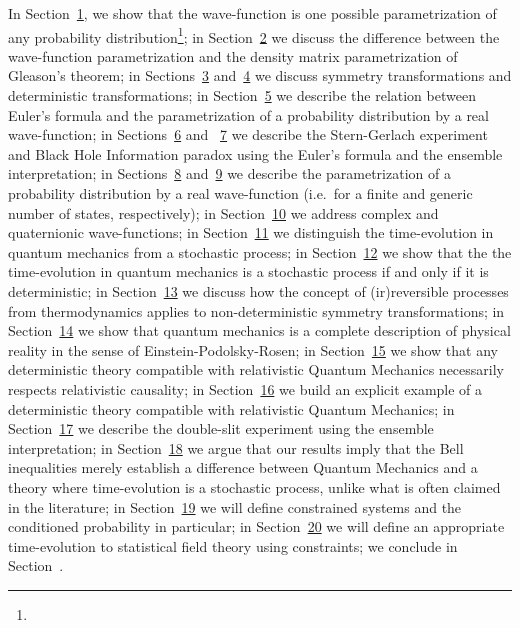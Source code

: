 \documentclass[11pt]{book}
\begin{document}
In Section~\protect\hyperlink{sec:prob}{1}, we show that the
wave-function is one possible parametrization of any probability
distribution\footnote{}; in Section~\protect\hyperlink{sec:density}{2}
we discuss the difference between the wave-function parametrization and
the density matrix parametrization of Gleason's theorem; in
Sections~\protect\hyperlink{sec:symmetries}{3}
and~\protect\hyperlink{sec:deterministic}{4} we discuss symmetry
transformations and deterministic transformations; in
Section~\protect\hyperlink{sec:euler}{5} we describe the relation
between Euler's formula and the parametrization of a probability
distribution by a real wave-function; in
Sections~\protect\hyperlink{sec:sg}{6} and
~\protect\hyperlink{sec:informationparadox}{7} we describe the
Stern-Gerlach experiment and Black Hole Information paradox using the
Euler's formula and the ensemble interpretation; in
Sections~\protect\hyperlink{sec:mapN}{8}
and~\protect\hyperlink{sec:map}{9} we describe the parametrization of a
probability distribution by a real wave-function (i.e.~for a finite and
generic number of states, respectively); in
Section~\protect\hyperlink{sec:complex}{10} we address complex and
quaternionic wave-functions; in
Section~\protect\hyperlink{sec:stochastic}{11} we distinguish the
time-evolution in quantum mechanics from a stochastic process; in
Section~\protect\hyperlink{sec:timetranslation}{12} we show that the the
time-evolution in quantum mechanics is a stochastic process if and only
if it is deterministic; in
Section~\protect\hyperlink{sec:irreversible}{13} we discuss how the
concept of (ir)reversible processes from thermodynamics applies to
non-deterministic symmetry transformations; in
Section~\protect\hyperlink{sec:complete}{14} we show that quantum
mechanics is a complete description of physical reality in the sense of
Einstein-Podolsky-Rosen; in
Section~\protect\hyperlink{sec:relativistictheory}{15} we show that any
deterministic theory compatible with relativistic Quantum Mechanics
necessarily respects relativistic causality; in
Section~\protect\hyperlink{sec:deterministictheory}{16} we build an
explicit example of a deterministic theory compatible with relativistic
Quantum Mechanics; in Section~\protect\hyperlink{sec:doubleslit}{17} we
describe the double-slit experiment using the ensemble interpretation;
in Section~\protect\hyperlink{sec:bell}{18} we argue that our results
imply that the Bell inequalities merely establish a difference between
Quantum Mechanics and a theory where time-evolution is a stochastic
process, unlike what is often claimed in the literature; in
Section~\protect\hyperlink{sec:constraints}{19} we will define
constrained systems and the conditioned probability in particular; in
Section~\protect\hyperlink{sec:sft}{20} we will define an appropriate
time-evolution to statistical field theory using constraints; we
conclude in Section~.
\end{document}
